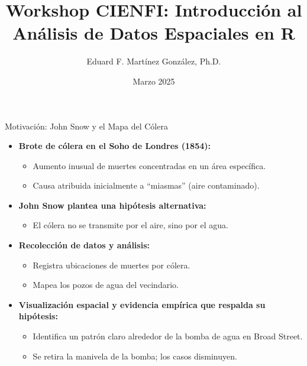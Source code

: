 \documentclass{beamer}
\title[CIENFI]{Workshop CIENFI: Introducción al Análisis de Datos Espaciales en R}
\author[U. Icesi]{Eduard F. Martínez González, Ph.D.}
\institute[]{Centro de Investigación en Economía y Finanzas (CIENFI) \\ Universidad Icesi}
\date{Marzo 2025}
\begin{document}
\begin{frame}
\titlepage
\end{frame}

\begin{frame}{Motivación: John Snow y el Mapa del Cólera}
\begin{itemize}
    \item \textbf{Brote de cólera en el Soho de Londres (1854):}
    \begin{itemize}
        \item Aumento inusual de muertes concentradas en un área específica.
        \item Causa atribuida inicialmente a “miasmas” (aire contaminado).
    \end{itemize}
    \item \textbf{John Snow plantea una hipótesis alternativa:}
    \begin{itemize}
        \item El cólera no se transmite por el aire, sino por el agua.
    \end{itemize}
    \item \textbf{Recolección de datos y análisis:}
    \begin{itemize}
        \item Registra ubicaciones de muertes por cólera.
        \item Mapea los pozos de agua del vecindario.
    \end{itemize}
    \item \textbf{Visualización espacial y evidencia empírica que respalda su hipótesis:}
    \begin{itemize}
        \item Identifica un patrón claro alrededor de la bomba de agua en Broad Street.
        \item Se retira la manivela de la bomba; los casos disminuyen.
    \end{itemize}
\end{itemize}
\end{frame}
\end{document}
